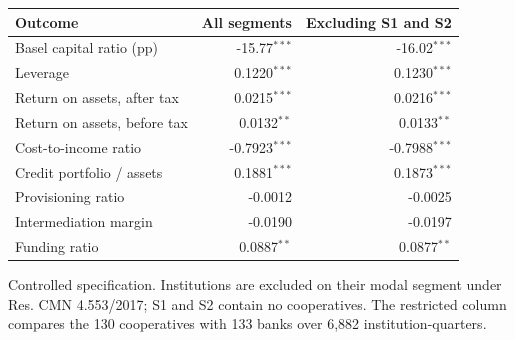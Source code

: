 \begin{tabular}{lrr}
\toprule
Outcome & All segments & Excluding S1 and S2 \\
\midrule
Basel capital ratio (pp) & -15.77$^{***}$ & -16.02$^{***}$ \\
Leverage & 0.1220$^{***}$ & 0.1230$^{***}$ \\
Return on assets, after tax & 0.0215$^{***}$ & 0.0216$^{***}$ \\
Return on assets, before tax & 0.0132$^{**}$ & 0.0133$^{**}$ \\
Cost-to-income ratio & -0.7923$^{***}$ & -0.7988$^{***}$ \\
Credit portfolio / assets & 0.1881$^{***}$ & 0.1873$^{***}$ \\
Provisioning ratio & -0.0012 & -0.0025 \\
Intermediation margin & -0.0190 & -0.0197 \\
Funding ratio & 0.0887$^{**}$ & 0.0877$^{**}$ \\
\bottomrule
\end{tabular}
\begin{tablenotes}[flushleft]\footnotesize
\item Controlled specification. Institutions are excluded on their modal segment under Res. CMN 4.553/2017; S1 and S2 contain no cooperatives. The restricted column compares the 130 cooperatives with 133 banks over 6,882 institution-quarters.
\end{tablenotes}
